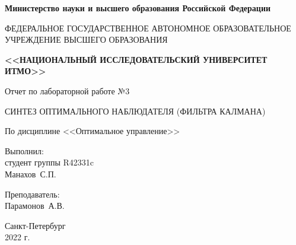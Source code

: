 \begin{titlepage}
	\begin{center}
		\begin{small}
			\textbf{Министерство науки и высшего образования Российской Федерации}

			ФЕДЕРАЛЬНОЕ ГОСУДАРСТВЕННОЕ АВТОНОМНОЕ ОБРАЗОВАТЕЛЬНОЕ УЧРЕЖДЕНИЕ ВЫСШЕГО ОБРАЗОВАНИЯ
			
			\textbf{<<НАЦИОНАЛЬНЫЙ ИССЛЕДОВАТЕЛЬСКИЙ УНИВЕРСИТЕТ ИТМО>>}
		\end{small}
		
		\vspace{8em}
		
		Отчет по лабораторной работе №3
		
		СИНТЕЗ ОПТИМАЛЬНОГО НАБЛЮДАТЕЛЯ (ФИЛЬТРА КАЛМАНА)
		
		По дисциплине <<Оптимальное управление>>
	\end{center}
	
	\vspace{8em}
	
	\begin{flushright}
		Выполнил:\\
		студент группы R42331c\\
		Манахов~С.П.
		
		\vspace{1em}
		
		Преподаватель:\\
		Парамонов~А.В.
	\end{flushright}

	\vfill
	
	\begin{center}
		\small
		Санкт-Петербург\\
		2022 г.\\
	\end{center}
\end{titlepage}